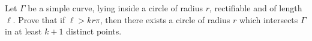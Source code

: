 Let $\Gamma$ be a simple curve, lying inside a circle of radius $r$, rectifiable and of length $\ell$. Prove that if $\ell > kr\pi$, then there exists a circle of radius $r$ which intersects $\Gamma$ in at least $k+1$ distinct points.